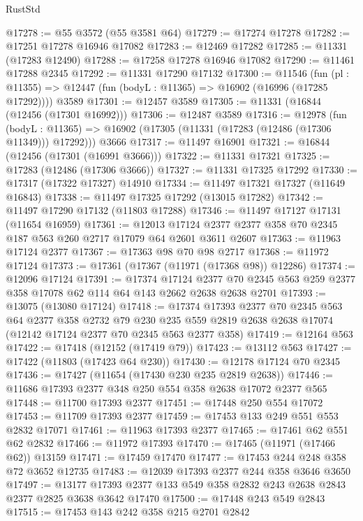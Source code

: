 \begin{lexlean}{RustStd}
\begin{coremodule}
@17278 := @55 @3572 (@55 @3581 @64)
@17279 := @17274 @17278
@17282 := @17251 @17278 @16946 @17082
@17283 := @12469 @17282
@17285 := @11331 (@17283 @12490)
@17288 := @17258 @17278 @16946 @17082
@17290 := @11461 @17288 @2345
@17292 := @11331 @17290 @17132
@17300 := @11546
    (fun (pl : @11355) => @12447 (fun (bodyL : @11365) => @16902 (@16996 (@17285 @17292))))
    @3589
@17301 := @12457 @3589
@17305 := @11331 (@16844 (@12456 (@17301 @16992)))
@17306 := @12487 @3589
@17316 := @12978
    (fun (bodyL : @11365) => @16902 (@17305 (@11331 (@17283 (@12486 (@17306 @11349))) @17292)))
    @3666
@17317 := @11497 @16901
@17321 := @16844 (@12456 (@17301 (@16991 @3666)))
@17322 := @11331 @17321
@17325 := @17283 (@12486 (@17306 @3666))
@17327 := @11331 @17325 @17292
@17330 := @17317 (@17322 @17327) @14910
@17334 := @11497 @17321 @17327 (@11649 @16843)
@17338 := @11497 @17325 @17292 (@13015 @17282)
@17342 := @11497 @17290 @17132 (@11803 @17288)
@17346 := @11497 @17127 @17131 (@11654 @16959)
@17361 := @12013 @17124 @2377 @2377 @358 @70 @2345 @187 @563 @260 @2717 @17079 @64 @2601 @3611 @2607
@17363 := @11963 @17124 @2377
@17367 := @17363 @98 @70 @98 @2717
@17368 := @11972 @17124
@17373 := @17361 (@17367 (@11971 (@17368 @98)) @12286)
@17374 := @12096 @17124
@17391 := @17374
    @17124
    @2377
    @70
    @2345
    @563
    @259
    @2377
    @358
    @17078
    @62
    @114
    @64
    @143
    @2662
    @2638
    @2638
    @2701
@17393 := @13075 (@13080 @17124)
@17418 := @17374
    @17393
    @2377
    @70
    @2345
    @563
    @64
    @2377
    @358
    @2732
    @79
    @230
    @235
    @559
    @2819
    @2638
    @2638
    @17074
    (@12142 @17124 @2377 @70 @2345 @563 @2377 @358)
@17419 := @12164 @563
@17422 := @17418 (@12152 (@17419 @79))
@17423 := @13112 @563
@17427 := @17422 (@11803 (@17423 @64 @230))
@17430 := @12178 @17124 @70 @2345
@17436 := @17427 (@11654 (@17430 @230 @235 @2819 @2638))
@17446 := @11686 @17393 @2377 @348 @250 @554 @358 @2638 @17072 @2377 @565
@17448 := @11700 @17393 @2377
@17451 := @17448 @250 @554 @17072
@17453 := @11709 @17393 @2377
@17459 := @17453 @133 @249 @551 @553 @2832 @17071
@17461 := @11963 @17393 @2377
@17465 := @17461 @62 @551 @62 @2832
@17466 := @11972 @17393
@17470 := @17465 (@11971 (@17466 @62)) @13159
@17471 := @17459 @17470
@17477 := @17453 @244 @248 @358 @72 @3652 @12735
@17483 := @12039 @17393 @2377 @244 @358 @3646 @3650
@17497 := @13177 @17393 @2377 @133 @549 @358 @2832 @243 @2638 @2843 @2377 @2825 @3638 @3642 @17470
@17500 := @17448 @243 @549 @2843
@17515 := @17453
    @143
    @242
    @358
    @215
    @2701
    @2842

\end{coremodule}
\end{lexlean}
